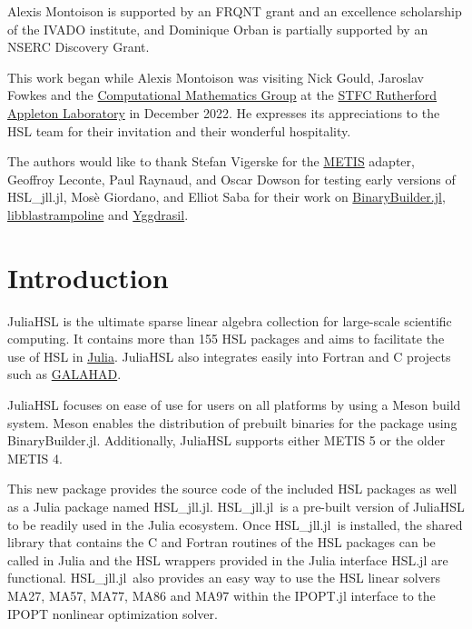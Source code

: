 \documentclass[gdweb]{geradwp}
\newcommand{\HSLjll}{HSL\_jll.jl}
\begin{document}
\begin{GDacknowledgements}
Alexis Montoison is supported by an FRQNT grant and an excellence scholarship of the IVADO institute, and Dominique Orban is partially supported by an NSERC Discovery Grant.

This work began while Alexis Montoison was visiting Nick Gould, Jaroslav Fowkes and the \href{https://www.numerical.rl.ac.uk/}{Computational Mathematics Group} at the \href{https://www.ukri.org/about-us/stfc/locations/rutherford-appleton-laboratory/}{STFC Rutherford Appleton Laboratory} in December 2022.
He expresses its appreciations to the HSL team for their invitation and their wonderful hospitality.

The authors would like to thank Stefan Vigerske for the \href{https://github.com/KarypisLab/METIS}{METIS} adapter, Geoffroy Leconte, Paul Raynaud, and Oscar Dowson for testing early versions of \HSLjll, Mosè Giordano, and Elliot Saba for their work on \href{https://github.com/JuliaPackaging/BinaryBuilder.jl}{BinaryBuilder.jl}, \href{https://github.com/JuliaLinearAlgebra/libblastrampoline}{libblastrampoline} and \href{https://github.com/JuliaPackaging/Yggdrasil}{Yggdrasil}.
\end{GDacknowledgements}


\GDarticlestart

\section{Introduction}

JuliaHSL is the ultimate sparse linear algebra collection for large-scale scientific computing.
It contains more than 155 HSL packages and aims to facilitate the use of HSL in \href{https://julialang.org/}{Julia}.
JuliaHSL also integrates easily into Fortran and C projects such as \href{https://github.com/ralna/GALAHAD}{GALAHAD}.

JuliaHSL focuses on ease of use for users on all platforms by using a Meson build system.
Meson enables the distribution of prebuilt binaries for the package using BinaryBuilder.jl.
Additionally, JuliaHSL supports either METIS 5 or the older METIS 4.

This new package provides the source code of the included HSL packages as well as a Julia package named \HSLjll.
\HSLjll~is a pre-built version of JuliaHSL to be readily used in the Julia ecosystem.
Once \HSLjll~is installed, the shared library that contains the C and Fortran routines of the HSL packages can be called in Julia and the HSL wrappers provided in the Julia interface HSL.jl are functional.
\HSLjll~also provides an easy way to use the HSL linear solvers MA27, MA57, MA77, MA86 and MA97 within the IPOPT.jl interface to the IPOPT nonlinear optimization solver.
\end{document}
